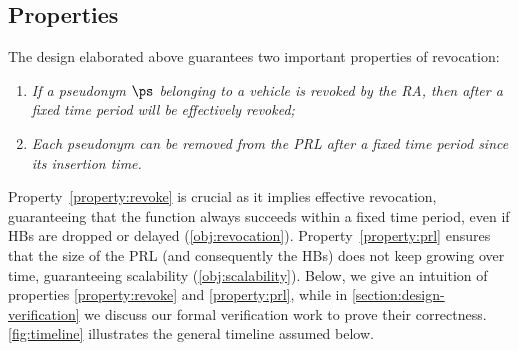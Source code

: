 \subsection{Properties}
\label{section:design-properties}



The design elaborated above guarantees two important properties of revocation:
\begin{enumerate}
    \item[{\crtcrossreflabel{(i)}[property:revoke]}] \emph{If a pseudonym $\ps$
    belonging to a vehicle  is revoked by the \ac{RA}, then after a
    fixed time period \paramteff{}  will be effectively
    revoked;}
    \item[{\crtcrossreflabel{(ii)}[property:prl]}] \emph{Each pseudonym can be
    removed from the \ac{PRL} after a fixed time period \paramtprl{} since its
    insertion time.}
\end{enumerate}

Property~\ref{property:revoke} is crucial as it implies effective revocation,
guaranteeing that the \funcrevokedaa{} function always succeeds within a fixed
time period, even if \acp{HB} are dropped or delayed (\ref{obj:revocation}).
Property~\ref{property:prl} ensures that the size of the \ac{PRL} (and
consequently the \acp{HB}) does not keep growing over time, guaranteeing
scalability (\ref{obj:scalability}). Below, we give an intuition of properties
\ref{property:revoke} and \ref{property:prl}, while in
\cref{section:design-verification} we discuss our formal verification work to
prove their correctness. \cref{fig:timeline} illustrates the general timeline
assumed below.

